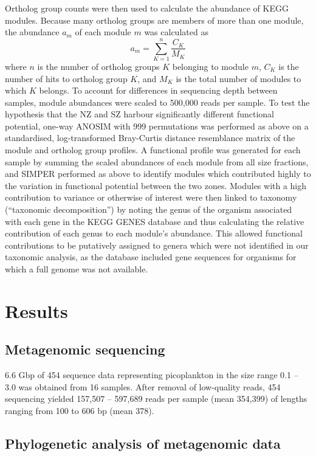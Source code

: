 Ortholog group counts were then used to calculate the abundance of KEGG modules.
Because many ortholog groups are members of more than one module, the abundance $a_m$ of each module $m$ was calculated as 
\[
a_{m}=\sum_{K=1}^{n}\frac{C_{K}}{M_K}
\]
where $n$ is the number of ortholog groups $K$ belonging to module $m$, $C_{K}$ is the number of hits to ortholog group $K$, and $M_{K}$ is the total number of modules to which $K$ belongs.
To account for differences in sequencing depth between samples, module abundances were scaled to 500,000 reads per sample. 
To test the hypothesis that the \ac{NZ} and \ac{SZ} harbour significantly different functional potential, one-way \ac{ANOSIM} with 999 permutations was performed as above on a standardised, log-transformed Bray-Curtis distance resemblance matrix of the module and ortholog group profiles. 
A functional profile was generated for each sample by summing the scaled abundances of each module from all size fractions, and \ac{SIMPER} performed as above to identify modules which contributed highly to the variation in functional potential between the two zones. 
Modules with a high contribution to variance or otherwise of interest were then linked to taxonomy (``taxonomic decomposition'') by noting the genus of the organism associated with each gene in the \ac{KEGG} GENES database and thus calculating the relative contribution of each genus to each module's abundance. 
This allowed functional contributions to be putatively assigned to genera which were not identified in our taxonomic analysis, as the database included gene sequences for organisms for which a full genome was not available.

\section{Results}

\subsection{Metagenomic sequencing}
6.6 Gbp of 454 sequence data representing picoplankton in the size range 0.1 -- 3.0 \micron{} was obtained from 16 samples. 
After removal of low-quality reads, 454 sequencing yielded 157,507 -- 597,689 reads per sample (mean 354,399) of lengths ranging from 100 to 606 bp (mean 378).

\subsection{Phylogenetic analysis of metagenomic data}

